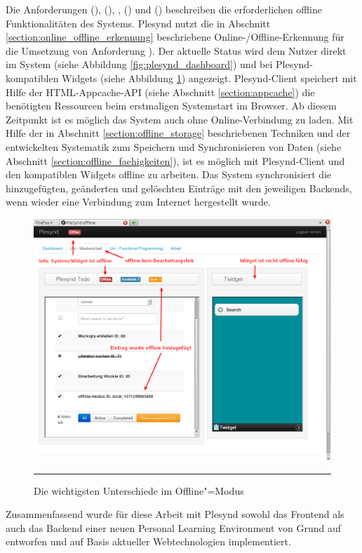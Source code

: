 Die Anforderungen  (\emph{\requirementCheckOnlineStatus}),  (\emph{\requirementOnlineStatusInformUser}),  \emph{\requirementOfflineStart},  (\emph{\requirementOfflineWork}) und  (\emph{\requirementOnlineSync}) beschreiben die erforderlichen offline Funktionalitäten des Systems. Plesynd nutzt die in Abschnitt \ref{section:online_offline_erkennung} beschriebene Online-/Offline-Erkennung für die Umsetzung von Anforderung ). Der aktuelle Status wird dem Nutzer direkt im System (siehe Abbildung \ref{fig:plesynd_dashboard}) und bei Plesynd-kompatiblen Widgets (siehe Abbildung \ref{fig:plesynd_workspace_offline}) angezeigt. Plesynd-Client speichert mit Hilfe der HTML-Appcache-API (siehe Abschnitt \ref{section:appcache}) die benötigten Ressourcen beim erstmaligen Systemstart im Browser. Ab diesem Zeitpunkt ist es möglich das System auch ohne Online-Verbindung zu laden. Mit Hilfe der in Abschnitt \ref{section:offline_storage} beschriebenen Techniken und der entwickelten Systematik zum Speichern und Synchronisieren von Daten (siehe Abschnitt \ref{section:offline_faehigkeiten}), ist es möglich mit Plesynd-Client und den kompatiblen Widgets offline zu arbeiten. Das System synchronisiert die hinzugefügten, geänderten und gelöschten Einträge mit den jeweiligen Backends, wenn wieder eine Verbindung zum Internet hergestellt wurde.
\begin{figure}[H]
  \centering
  \includegraphics[width=\textwidth]{./Figures/plesynd_workspace_offline.png}
    \rule{35em}{0.5pt}
  \caption[Plesynd User"=Interface: Workspace Offline]{Die wichtigsten Unterschiede im Offline"=Modus}
  \label{fig:plesynd_workspace_offline}
\end{figure}

Zusammenfassend wurde für diese Arbeit mit Plesynd sowohl das Frontend als auch das Backend einer neuen Personal Learning Environment von Grund auf entworfen und auf Basis aktueller Webtechnologien implementiert.
